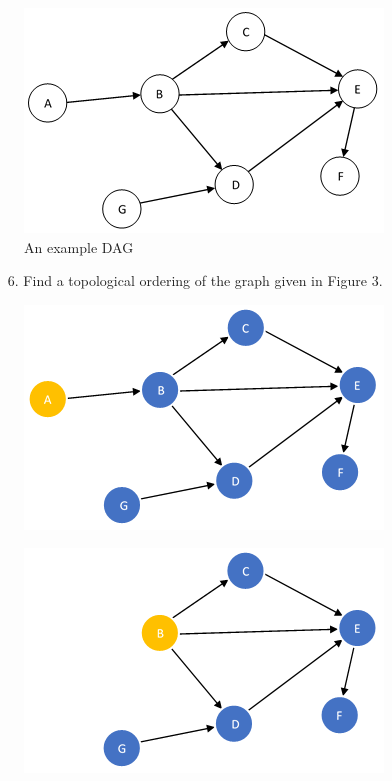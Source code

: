 \documentclass{article}
\begin{document}
\begin{figure}[H]
\centering
\includegraphics[scale=0.8]{figure-3.png}
\caption{An example DAG}
\end{figure}

\newpage

\begin{enumerate}[leftmargin=\labelsep]
  \item[6.] Find a topological ordering of the graph given in Figure 3.
  \newline
\end{enumerate}

\begin{figure}[H]
\centering
\includegraphics[scale=0.6]{images/Q6/01.png}
\end{figure}

\begin{figure}[H]
\centering
\includegraphics[scale=0.6]{images/Q6/02.png}
\end{figure}
\end{document}
